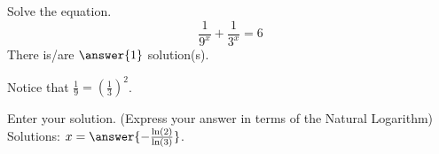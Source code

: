 \documentclass{ximera}
\author{Bobby Ramsey}
\begin{document}
\begin{exercise}
	Solve the equation.
	\[ \frac{1}{9^x} + \frac{1}{3^x} = 6 \]
	There is/are $\answer{1}$ solution(s).
	\begin{hint}
		Notice that $\frac{1}{9} = \left( \frac{1}{3} \right)^2$.
	\end{hint}
	\begin{exercise}
		Enter your solution. (Express your answer in terms of the Natural Logarithm)
		Solutions: $x = \answer{ -\frac{\ln(2)}{\ln(3)} }$.
	\end{exercise}
\end{exercise}
\end{document}
